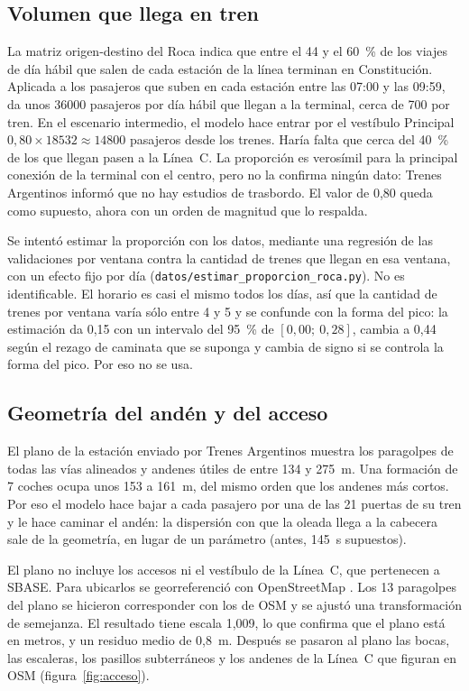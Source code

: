 \subsection{Volumen que llega en tren}
\label{anx:volumen}

La matriz origen-destino del Roca indica que entre el 44 y el 60~\% de los viajes de día hábil que salen
de cada estación de la línea terminan en Constitución. Aplicada a los pasajeros que suben en cada estación
entre las 07:00 y las 09:59, da unos \num{36000} pasajeros por día hábil que llegan a la terminal,
cerca de 700 por tren. En el escenario intermedio, el modelo hace entrar por el vestíbulo Principal
$0{,}80 \times \num{18532} \approx \num{14800}$ pasajeros desde los trenes. Haría falta que cerca del 40~\%
de los que llegan pasen a la Línea~C. La proporción es verosímil para la principal conexión de la
terminal con el centro, pero no la confirma ningún dato: Trenes Argentinos informó que no hay estudios de
trasbordo. El valor de 0,80 queda como supuesto, ahora con un orden de magnitud que lo respalda.

Se intentó estimar la proporción con los datos, mediante una regresión de las validaciones por ventana
contra la cantidad de trenes que llegan en esa ventana, con un efecto fijo por día
(\texttt{datos/estimar\_proporcion\_roca.py}). No es identificable. El horario es casi el mismo todos los
días, así que la cantidad de trenes por ventana varía sólo entre 4 y 5 y se confunde con la forma del pico:
la estimación da 0,15 con un intervalo del 95~\% de $[0{,}00;\ 0{,}28]$, cambia a 0,44 según el rezago de
caminata que se suponga y cambia de signo si se controla la forma del pico. Por eso no se usa.

\subsection{Geometría del andén y del acceso}
\label{anx:geometria}

El plano de la estación enviado por Trenes Argentinos muestra los paragolpes de todas las vías alineados y
andenes útiles de entre 134 y 275~m. Una formación de 7 coches ocupa unos 153 a 161~m, del mismo orden que
los andenes más cortos. Por eso el modelo hace bajar a cada pasajero por una de las 21 puertas de su tren y
le hace caminar el andén: la dispersión con que la oleada llega a la cabecera sale de la geometría, en lugar
de un parámetro (antes, 145~s supuestos).

El plano no incluye los accesos ni el vestíbulo de la Línea~C, que pertenecen a SBASE. Para ubicarlos se
georreferenció con OpenStreetMap \parencite{osm2026}. Los 13 paragolpes del plano se hicieron corresponder
con los de OSM y se ajustó una transformación de semejanza. El resultado tiene escala 1,009, lo que
confirma que el plano está en metros, y un residuo medio de 0,8~m. Después se pasaron al plano las bocas,
las escaleras, los pasillos subterráneos y los andenes de la Línea~C que figuran en OSM
(figura~\ref{fig:acceso}).

